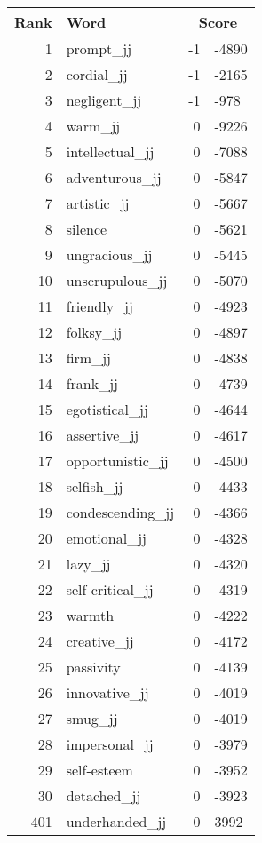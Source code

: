 \begin{longtable}[!htbp]{| rlr@{.}l |}
    \hline
    \textbf{Rank} & \textbf{Word} & \multicolumn{2}{c|}{\textbf{Score}} \\
    \hline
    \endhead
    1 & prompt\_jj & -1 & -4890 \\
    2 & cordial\_jj & -1 & -2165 \\
    3 & negligent\_jj & -1 & -978 \\
    4 & warm\_jj & 0 & -9226 \\
    5 & intellectual\_jj & 0 & -7088 \\
    6 & adventurous\_jj & 0 & -5847 \\
    7 & artistic\_jj & 0 & -5667 \\
    8 & silence & 0 & -5621 \\
    9 & ungracious\_jj & 0 & -5445 \\
    10 & unscrupulous\_jj & 0 & -5070 \\
    11 & friendly\_jj & 0 & -4923 \\
    12 & folksy\_jj & 0 & -4897 \\
    13 & firm\_jj & 0 & -4838 \\
    14 & frank\_jj & 0 & -4739 \\
    15 & egotistical\_jj & 0 & -4644 \\
    16 & assertive\_jj & 0 & -4617 \\
    17 & opportunistic\_jj & 0 & -4500 \\
    18 & selfish\_jj & 0 & -4433 \\
    19 & condescending\_jj & 0 & -4366 \\
    20 & emotional\_jj & 0 & -4328 \\
    21 & lazy\_jj & 0 & -4320 \\
    22 & self-critical\_jj & 0 & -4319 \\
    23 & warmth & 0 & -4222 \\
    24 & creative\_jj & 0 & -4172 \\
    25 & passivity & 0 & -4139 \\
    26 & innovative\_jj & 0 & -4019 \\
    27 & smug\_jj & 0 & -4019 \\
    28 & impersonal\_jj & 0 & -3979 \\
    29 & self-esteem & 0 & -3952 \\
    30 & detached\_jj & 0 & -3923 \\
    401 & underhanded\_jj & 0 & 3992 \\

\end{longtable}
